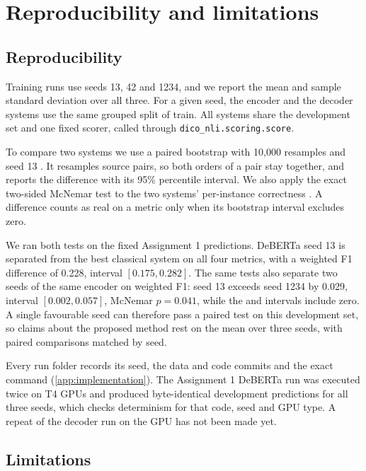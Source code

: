 \section{Reproducibility and limitations}
\label{sec:reproducibility}

\subsection{Reproducibility}

Training runs use seeds 13, 42 and 1234, and we report the mean and sample standard deviation over all three. For a given seed, the encoder and the decoder systems use the same grouped split of train. All systems share the development set and one fixed scorer, called through \texttt{dico\_nli.scoring.score}.

To compare two systems we use a paired bootstrap with 10,000 resamples and seed 13 \citep{berg-kirkpatrick-etal-2012-empirical}. It resamples source pairs, so both orders of a pair stay together, and reports the difference with its 95\% percentile interval. We also apply the exact two-sided McNemar test to the two systems' per-instance correctness \citep{mcnemar1947}. A difference counts as real on a metric only when its bootstrap interval excludes zero.

We ran both tests on the fixed Assignment 1 predictions. DeBERTa seed 13 is separated from the best classical system on all four metrics, with a weighted F1 difference of 0.228, interval $[0.175, 0.282]$. The same tests also separate two seeds of the same encoder on weighted F1: seed 13 exceeds seed 1234 by 0.029, interval $[0.002, 0.057]$, McNemar $p = 0.041$, while the \SoftCons{} and \HardCons{} intervals include zero. A single favourable seed can therefore pass a paired test on this development set, so claims about the proposed method rest on the mean over three seeds, with paired comparisons matched by seed.

Every run folder records its seed, the data and code commits and the exact command (\cref{app:implementation}). The Assignment 1 DeBERTa run was executed twice on T4 GPUs and produced byte-identical development predictions for all three seeds, which checks determinism for that code, seed and GPU type. A repeat of the decoder run on the GPU has not been made yet.

\subsection{Limitations}

